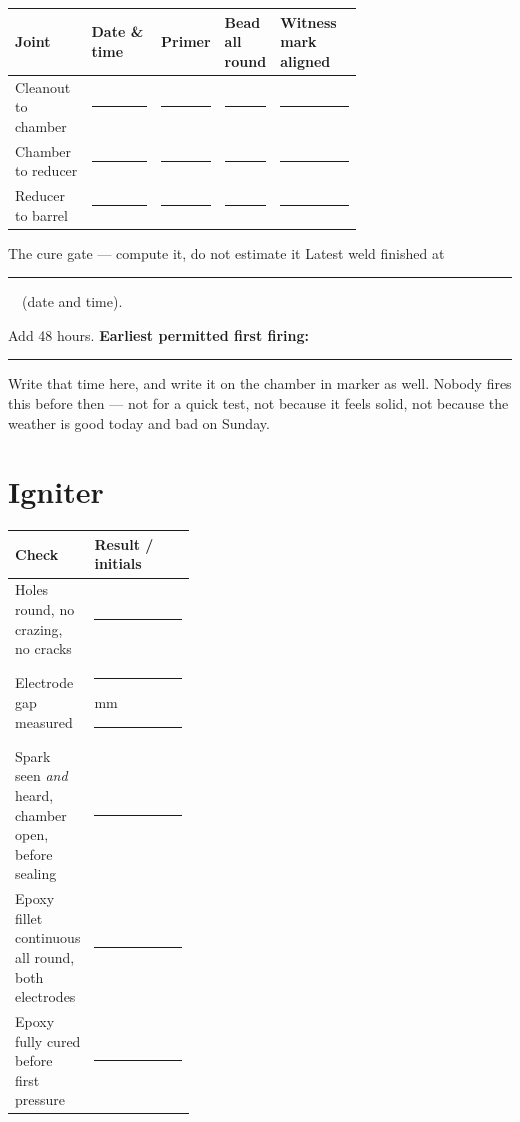 \begin{tabularx}{\linewidth}{@{}p{0.22\linewidth}p{0.20\linewidth}p{0.11\linewidth}p{0.16\linewidth}L@{}}
\toprule
\textbf{Joint} & \textbf{Date \& time} & \textbf{Primer} & \textbf{Bead all round} & \textbf{Witness mark aligned}\\
\midrule
Cleanout to chamber & \rule{0.85\linewidth}{0.4pt} & \rule{0.7\linewidth}{0.4pt} & \rule{0.75\linewidth}{0.4pt} & \rule{0.8\linewidth}{0.4pt}\\[0.7em]
Chamber to reducer & \rule{0.85\linewidth}{0.4pt} & \rule{0.7\linewidth}{0.4pt} & \rule{0.75\linewidth}{0.4pt} & \rule{0.8\linewidth}{0.4pt}\\[0.7em]
Reducer to barrel & \rule{0.85\linewidth}{0.4pt} & \rule{0.7\linewidth}{0.4pt} & \rule{0.75\linewidth}{0.4pt} & \rule{0.8\linewidth}{0.4pt}\\
\bottomrule
\end{tabularx}

\vspace{0.4em}
\begin{gate}{The cure gate --- compute it, do not estimate it}
Latest weld finished at \rule{0.30\linewidth}{0.4pt}\ \ (date and time).\par
\vspace{0.5em}
Add 48 hours. \textbf{Earliest permitted first firing:}
\rule{0.42\linewidth}{0.4pt}\par
\vspace{0.5em}
Write that time here, and write it on the chamber in marker as well. Nobody
fires this before then --- not for a quick test, not because it feels solid, not
because the weather is good today and bad on Sunday.
\end{gate}

\section{Igniter}
\begin{tabularx}{\linewidth}{@{}p{0.36\linewidth}L@{}}
\toprule
\textbf{Check} & \textbf{Result / initials}\\
\midrule
Holes round, no crazing, no cracks & \rule{0.7\linewidth}{0.4pt}\\[0.5em]
Electrode gap measured & \rule{0.35\linewidth}{0.4pt} mm \hfill \rule{0.3\linewidth}{0.4pt}\\[0.5em]
Spark seen \emph{and} heard, chamber open, before sealing & \rule{0.7\linewidth}{0.4pt}\\[0.5em]
Epoxy fillet continuous all round, both electrodes & \rule{0.7\linewidth}{0.4pt}\\[0.5em]
Epoxy fully cured before first pressure & \rule{0.7\linewidth}{0.4pt}\\
\bottomrule
\end{tabularx}

